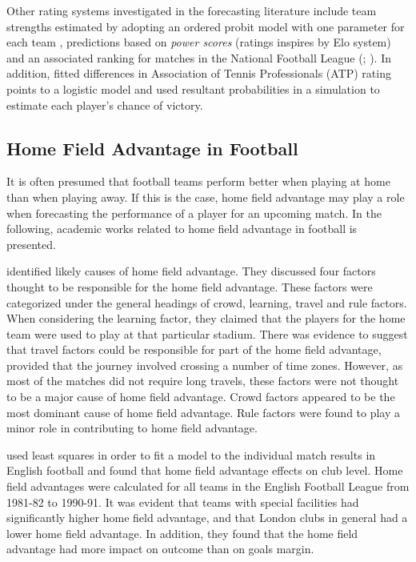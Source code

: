 \newpar

Other rating systems investigated in the forecasting literature include team strengths estimated by adopting an ordered probit model with one parameter for each team \citep{Graham}, predictions based on \textit{power scores} (ratings inspires by Elo system) and an associated ranking for matches in the National Football League (\citep{Boulier}; \citep{Amundson}). In addition, \cite{Clarke_2} fitted differences in Association of Tennis Professionals (ATP) rating points to a logistic model and used resultant probabilities in a simulation to estimate each player's chance of victory. 

\subsection{Home Field Advantage in Football}\label{HomeFieldAdvantage}

It is often presumed that football teams perform better when playing at home than when playing away. If this is the case, home field advantage may play a role when forecasting the performance of a player for an upcoming match. In the following, academic works related to home field advantage in football is presented.

\newpar

\cite{Nevill} identified likely causes of home field advantage. They discussed four factors thought to be responsible for the home field advantage. These factors were categorized under the general headings of crowd, learning, travel and rule factors. When considering the learning factor, they claimed that the players for the home team were used to play at that particular stadium. There was evidence to suggest that travel factors could be responsible for part of the home field advantage, provided that the journey involved crossing a number of time zones. However, as most of the matches did not require long travels, these factors were not thought to be a major cause of home field advantage. Crowd factors appeared to be the most dominant cause of home field advantage. Rule factors were found to play a minor role in contributing to home field advantage. 

\newpar

\cite{Clarke} used least squares in order to fit a model to the individual match results in English football and found that home field advantage effects on club level. Home field advantages were calculated for all teams in the English Football League from 1981-82 to 1990-91. It was evident that teams with special facilities had significantly higher home field advantage, and that London clubs in general had a lower home field advantage. In addition, they found that the home field advantage had more impact on outcome than on goals margin.

